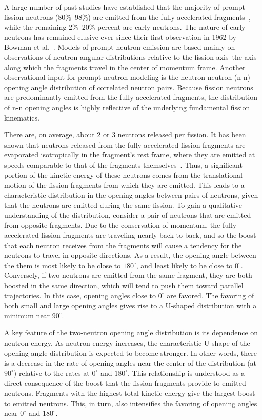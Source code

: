 A large number of past studies have established that the majority of prompt fission neutrons (80\%--98\%) are emitted from the fully accelerated fragments~\cite{Scission2005}, while the remaining 2\%--20\% percent are early neutrons.
The nature of early neutrons has remained elusive ever since their first observation in 1962 by Bowman et al.~\cite{Bowman}.
Models of prompt neutron emission are based mainly on observations of neutron angular distributions relative to the fission axis--the axis along which the fragments travel in the center of momentum frame.
Another observational input for prompt neutron modeling is the neutron-neutron (n-n) opening angle distribution of correlated neutron pairs.
Because fission neutrons are predominantly emitted from the fully accelerated fragments, the distribution of n-n opening angles is highly reflective of the underlying fundamental fission kinematics.

There are, on average, about 2 or 3 neutrons released per fission.
It has been shown that neutrons released from the fully accelerated fission fragments are evaporated isotropically in the fragment's rest frame, where they are emitted at speeds comparable to that of the fragments themselves~\cite{fragmentRestFrame}.
Thus, a significant portion of the kinetic energy of these neutrons comes from the translational motion of the fission fragments from which they are emitted.
This leads to a characteristic distribution in the opening angles between pairs of neutrons, given that the neutrons are emitted during the same fission.
To gain a qualitative understanding of the distribution, consider a pair of neutrons that are emitted from opposite fragments.
Due to the conservation of momentum, the fully accelerated fission fragments are traveling nearly back-to-back, and so the boost that each neutron receives from the fragments will cause a tendency for the neutrons to travel in opposite directions.
As a result, the opening angle between the them is most likely to be close to $180^{\circ}$, and least likely to be close to $0^{\circ}$.
Conversely, if two neutrons are emitted from the same fragment, they are both boosted in the same direction, which will tend to push them toward parallel trajectories.
In this case, opening angles close to $0^{\circ}$ are favored.
The favoring of both small and large opening angles gives rise to a U-shaped distribution with a minimum near $90^{\circ}$.

A key feature of the two-neutron opening angle distribution is its dependence on neutron energy.
As neutron energy increases, the characteristic U-shape of the opening angle distribution is expected to become stronger.
In other words, there is a decrease in the rate of opening angles near the center of the distribution (at $90^{\circ}$) relative to the rates at $0^{\circ}$ and $180^{\circ}$.
This relationship is understood as a direct consequence of the boost that the fission fragments provide to emitted neutrons.
Fragments with the highest total kinetic energy give the largest boost to emitted neutrons.
This, in turn, also intensifies the favoring of opening angles near $0^{\circ}$ and $180^{\circ}$.

